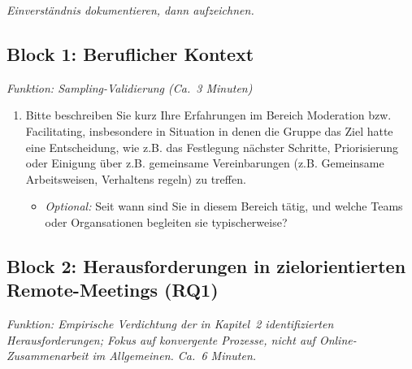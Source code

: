 \medskip
\textit{Einverständnis dokumentieren, dann aufzeichnen.}

\subsection*{Block 1: Beruflicher Kontext}
\textit{Funktion: Sampling-Validierung (Ca.\ 3 Minuten)}

\begin{enumerate}[label=1.\arabic*, leftmargin=*]
  \item Bitte beschreiben Sie kurz Ihre Erfahrungen im Bereich Moderation bzw. Facilitating, insbesondere in
    Situation in denen die Gruppe das Ziel hatte eine Entscheidung, wie z.B. das Festlegung nächster Schritte,
    Priorisierung oder Einigung über z.B. gemeinsame Vereinbarungen (z.B. Gemeinsame Arbeitsweisen,
    Verhaltens regeln) zu treffen.
    \begin{itemize}[label=\textendash]
      \item \textit{Optional:} Seit wann sind Sie in diesem Bereich tätig, und welche Teams oder
        Organsationen begleiten sie typischerweise?
    \end{itemize}
\end{enumerate}

\subsection*{Block 2: Herausforderungen in zielorientierten Remote-Meetings (RQ1)}
\textit{Funktion: Empirische Verdichtung der in Kapitel~2 identifizierten Herausforderungen;
  Fokus auf konvergente Prozesse, nicht auf Online-Zusammenarbeit im Allgemeinen.
Ca.\ 6 Minuten.}

